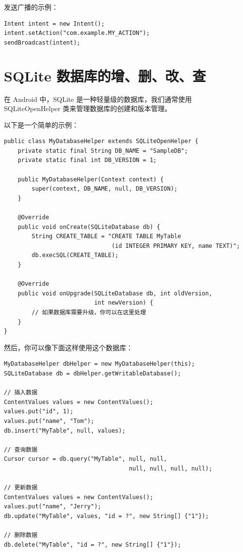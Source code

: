 \documentclass[12pt, a4paper, oneside]{ctexbook}
\numberwithin{figure}{section}
\begin{document}
发送广播的示例：
\begin{verbatim}
Intent intent = new Intent();
intent.setAction("com.example.MY_ACTION");
sendBroadcast(intent);

\end{verbatim}

\section{SQLite 数据库的增、删、改、查}
在 Android 中，SQLite 是一种轻量级的数据库，我们通常使用 SQLiteOpenHelper 类来管理数据库的创建和版本管理。

以下是一个简单的示例：
\begin{verbatim}
public class MyDatabaseHelper extends SQLiteOpenHelper {
    private static final String DB_NAME = "SampleDB";
    private static final int DB_VERSION = 1;
    
    public MyDatabaseHelper(Context context) {
        super(context, DB_NAME, null, DB_VERSION);
    }

    @Override
    public void onCreate(SQLiteDatabase db) {
        String CREATE_TABLE = "CREATE TABLE MyTable 
                               (id INTEGER PRIMARY KEY, name TEXT)";
        db.execSQL(CREATE_TABLE);
    }

    @Override
    public void onUpgrade(SQLiteDatabase db, int oldVersion, 
                          int newVersion) {
        // 如果数据库需要升级，你可以在这里处理
    }
}

\end{verbatim}

然后，你可以像下面这样使用这个数据库：

\begin{verbatim}
MyDatabaseHelper dbHelper = new MyDatabaseHelper(this);
SQLiteDatabase db = dbHelper.getWritableDatabase();

// 插入数据
ContentValues values = new ContentValues();
values.put("id", 1);
values.put("name", "Tom");
db.insert("MyTable", null, values);

// 查询数据
Cursor cursor = db.query("MyTable", null, null, 
                                    null, null, null, null);

// 更新数据
ContentValues values = new ContentValues();
values.put("name", "Jerry");
db.update("MyTable", values, "id = ?", new String[] {"1"});

// 删除数据
db.delete("MyTable", "id = ?", new String[] {"1"});

\end{verbatim}
\end{document}
